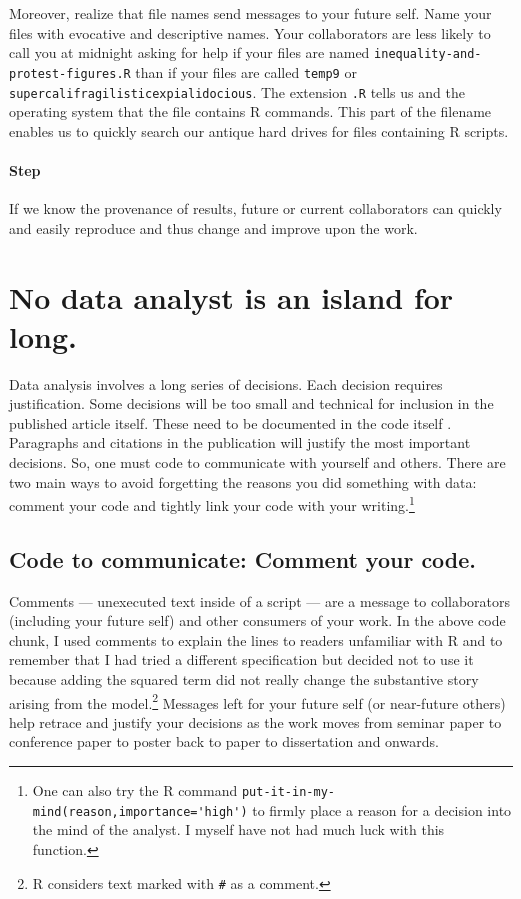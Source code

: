 \documentclass[12pt]{article}
\begin{document}
Moreover, realize that file names send messages to your future
self. Name your files with evocative and descriptive names. Your
collaborators are less likely to call you at midnight asking for help
if your files are named \Verb+inequality-and-protest-figures.R+ than
if your files are called \Verb+temp9+ or
\Verb+supercalifragilisticexpialidocious+. The extension
\Verb+.R+ tells us and the operating system that the file contains R
commands. This part of the filename enables us to quickly search our
antique hard drives for files containing R scripts.

\paragraph{Step \thesection} If we know the provenance of results, 
future  or current collaborators can quickly and easily reproduce
and thus change and improve upon the work.

\section{No data analyst is an island for long.}
Data analysis involves a long series of decisions. Each decision
requires justification.  Some decisions will be too small and
technical for inclusion in the published article itself. These need to
be documented in the code itself \citep{nagler1995coding}. Paragraphs
and citations in the publication will justify the most important
decisions. So, one must code to communicate with yourself and
others. There are two main ways to avoid forgetting the reasons you
did something with data: comment your code and tightly link your code
with your writing.\footnote{One can also try the R command
  \Verb+put-it-in-my-mind(reason,importance='high')+ to firmly place a
  reason for a decision into the mind of the analyst. I myself have
  not had much luck with this function.}

\subsection{Code to communicate: Comment your code.}
Comments --- unexecuted text inside of a script --- are a message to
collaborators (including your future self) and other consumers of your
work. In the above code chunk, I used comments to explain the lines to
readers unfamiliar with R and to remember that I had tried a different
specification but decided not to use it because adding the squared
term did not really change the substantive story arising from the
model.\footnote{R considers text marked with \Verb+#+ as a comment.}
Messages left for your future self (or near-future others) help
retrace and justify your decisions as the work moves from seminar
paper to conference paper to poster back to paper to dissertation and
onwards.
\end{document}
